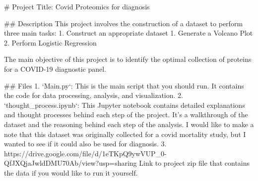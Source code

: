 # Project Title: Covid Proteomics for diagnosis

## Description
This project involves the construction of a dataset to perform three main tasks:
1. Construct an appropriate dataset
1. Generate a Volcano Plot
2. Perform Logistic Regression

The main objective of this project is to identify the optimal collection of proteins for a COVID-19 diagnostic panel.

## Files
1. `Main.py`: This is the main script that you should run. It contains the code for data processing, analysis, and visualization.
2. `thought_process.ipynb`: This Jupyter notebook contains detailed explanations and thought processes behind each step of the project. It's a walkthrough of the dataset and the reasoning behind each step of the analysis. I would like to make a note that this dataset was originally collected for a covid mortality study, but I wanted to see if it could also be used for diagnosis.
3. https://drive.google.com/file/d/1eTKpQ9ywVUP_0-QfJXQjaJwldDMU70Ab/view?usp=sharing Link to project zip file that contains the data if you would like to run it yourself.
